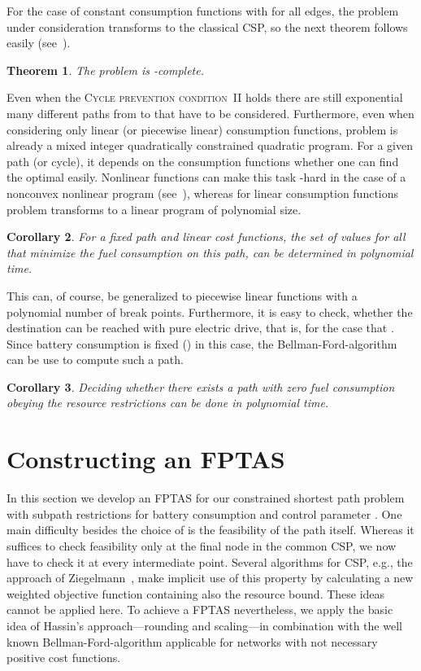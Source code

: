 \documentclass[a4paper]{scrartcl}
\newtheorem{theorem}{Theorem}
\newtheorem{corollary}[theorem]{Corollary}
\begin{document}
For the case of constant consumption functions with  for all edges, the problem under consideration transforms to the classical CSP, so the next theorem follows easily (see~\cite{Johnson_complexity}).

\begin{theorem} 
The problem  is -complete.
\end{theorem}

Even when the \textsc{Cycle prevention condition~II} holds there are still exponential many different paths from  to  that have to be considered. Furthermore, even when considering only linear (or piecewise linear) consumption functions, problem  is already a mixed integer quadratically constrained quadratic program. For a given path (or cycle), it depends on the consumption functions whether one can find the optimal  easily. Nonlinear functions can make this task -hard in the case of a nonconvex nonlinear program (see~\cite{Murty87}), whereas for linear consumption functions problem  transforms to a linear program of polynomial size.  

\begin{corollary}\label{coro:optalpha}
 For a fixed path  and linear cost functions, the set of  values for all  that minimize the fuel consumption on this path, can be determined in polynomial time.
\end{corollary}

This can, of course, be generalized to piecewise linear functions with a polynomial number of break points.
Furthermore, it is easy to check, whether the destination can be reached with pure electric drive, that is, for the case that . Since battery consumption is fixed () in this case, the Bellman-Ford-algorithm can be use to compute such a path.

\begin{corollary}\label{coro:zeroconsumption}
 Deciding whether there exists a path with zero fuel consumption obeying the resource restrictions can be done in polynomial time.
\end{corollary}

\section{Constructing an FPTAS}\label{sec:approximation}

In this section we develop an FPTAS for our constrained shortest path problem  with subpath restrictions for battery consumption and control parameter . One main difficulty besides the choice of  is the feasibility of the path itself. Whereas it suffices to check feasibility only at the final node  in the common CSP, we now have to check it at every intermediate point. Several algorithms for CSP, e.g., the approach of Ziegelmann~\cite{Ziegelmann_CSP}, make implicit use of this property by calculating a new weighted objective function containing also the resource bound. These ideas cannot be applied here. To achieve a {FPTAS} nevertheless, we apply the basic idea of Hassin's approach---rounding and scaling---in combination with the well known Bellman-Ford-algorithm applicable for networks with not necessary positive cost functions.
\end{document}
